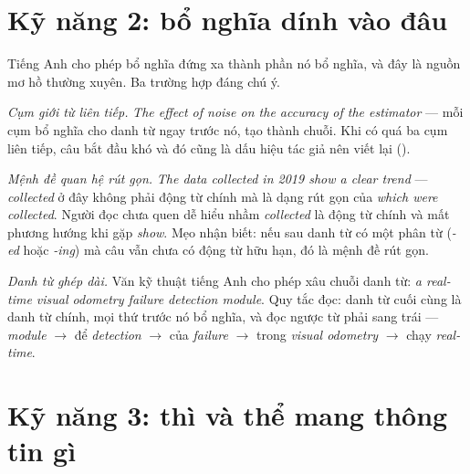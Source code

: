 \documentclass[../../english.tex]{subfiles}
\begin{document}
\begin{capdoi}
\end{capdoi}

\section{Kỹ năng 2: bổ nghĩa dính vào đâu}

Tiếng Anh cho phép bổ nghĩa đứng xa thành phần nó bổ nghĩa, và đây là nguồn mơ hồ thường xuyên. Ba trường hợp đáng chú ý.

\emph{Cụm giới từ liên tiếp.} \emph{The effect of noise on the accuracy of the estimator} --- mỗi cụm bổ nghĩa cho danh từ ngay trước nó, tạo thành chuỗi. Khi có quá ba cụm liên tiếp, câu bắt đầu khó và đó cũng là dấu hiệu tác giả nên viết lại ().

\emph{Mệnh đề quan hệ rút gọn.} \emph{The data collected in 2019 show a clear trend} --- \emph{collected} ở đây không phải động từ chính mà là dạng rút gọn của \emph{which were collected}. Người đọc chưa quen dễ hiểu nhầm \emph{collected} là động từ chính và mất phương hướng khi gặp \emph{show}. Mẹo nhận biết: nếu sau danh từ có một phân từ (\emph{-ed} hoặc \emph{-ing}) mà câu vẫn chưa có động từ hữu hạn, đó là mệnh đề rút gọn.

\emph{Danh từ ghép dài.} Văn kỹ thuật tiếng Anh cho phép xâu chuỗi danh từ: \emph{a real-time visual odometry failure detection module}. Quy tắc đọc: danh từ cuối cùng là danh từ chính, mọi thứ trước nó bổ nghĩa, và đọc ngược từ phải sang trái --- \emph{module} \(\rightarrow\) để \emph{detection} \(\rightarrow\) của \emph{failure} \(\rightarrow\) trong \emph{visual odometry} \(\rightarrow\) chạy \emph{real-time}.

\section{Kỹ năng 3: thì và thể mang thông tin gì}
\end{document}
